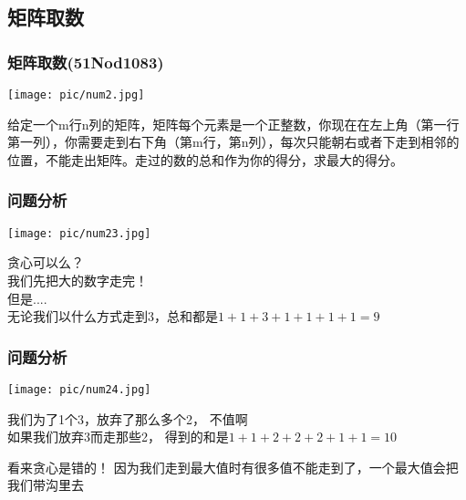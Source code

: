 \documentclass{beamer}
\begin{document}
\subsection{矩阵取数}
\begin{frame}
\frametitle{矩阵取数(51Nod1083)}

\begin{minipage}[b]{0.30\linewidth}
	\texttt{[image: pic/num2.jpg]}
\end{minipage}
\hfill
\begin{minipage}[b]{0.55\linewidth}
	
给定一个m行n列的矩阵，矩阵每个元素是一个正整数，你现在在左上角（第一行第一列），你需要走到右下角（第m行，第n列），每次只能朝右或者下走到相邻的位置，不能走出矩阵。走过的数的总和作为你的得分，求最大的得分。

\end{minipage}
\end{frame}

\begin{frame}[fragile]
\frametitle{问题分析}

\begin{minipage}[b]{0.30\linewidth}
	\texttt{[image: pic/num23.jpg]}
\end{minipage}
\hfill
\begin{minipage}[b]{0.55\linewidth}
贪心可以么？	\\
我们先把大的数字走完！~ \\
但是....\\
无论我们以什么方式走到3，总和都是$1 + 1 + 3 + 1 + 1 + 1 + 1 = 9$ \\
	
\end{minipage}


\end{frame}

\begin{frame}[fragile]
\frametitle{问题分析}

\begin{minipage}[b]{0.30\linewidth}
	\texttt{[image: pic/num24.jpg]}
\end{minipage}
\hfill
\begin{minipage}[b]{0.55\linewidth}
我们为了1个3，放弃了那么多个2， 不值啊\\
如果我们放弃3而走那些2， 得到的和是$1 + 1 + 2 + 2 + 2 + 1 + 1 = 10$ \\	
	
\end{minipage}

看来贪心是错的！ 因为我们走到最大值时有很多值不能走到了，一个最大值会把我们带沟里去
\end{frame}
\end{document}
